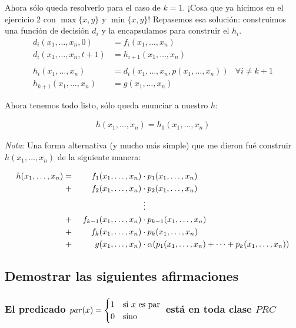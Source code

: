 \documentclass[fleqn, 11pt]{article}
\begin{document}
Ahora sólo queda resolverlo para el caso de $k = 1$. ¡Cosa que ya hicimos en el
ejercicio 2 con $\max\{x, y\}$ y $\min\{x, y\}$! Repasemos esa solución:
construimos una función de decisión $d_i$ y la encapsulamos para construir el
$h_i$.
\begin{align*}
	d_i(x_1, \dots, x_n, 0)     &= f_i(x_1, \dots, x_n) \\
	d_i(x_1, \dots, x_n, t + 1) &= h_{i + 1}(x_1, \dots, x_n) \\
	\\
	h_i(x_1, \dots, x_n)        &= d_i(x_1, \dots, x_n, p(x_1, \dots, x_n))
	& \forall i \neq k+1 \\
	h_{k+1}(x_1, \dots, x_n)    &= g(x_1, \dots, x_n)
\end{align*}

Ahora tenemos todo listo, sólo queda enunciar a nuestro $h$:

\begin{align*}
	h(x_1, \dots, x_n) = h_1(x_1, \dots, x_n)
\end{align*}

\emph{Nota}: Una forma alternativa (y mucho más simple) que me dieron fué
construir \\ $h(x_1, \dots, x_n)$ de la siguiente manera:

\begin{alignat*}{3}
	h(x_1, \dots, x_n)
	=&& f_1(x_1, \dots, x_n) &\cdot p_1(x_1, \dots, x_n) \\
	+&& f_2(x_1, \dots, x_n) &\cdot p_2(x_1, \dots, x_n) \\
	&&&\vdotswithin{\cdot} \\
	+&& \ f_{k-1}(x_1, \dots, x_n) &\cdot p_{k-1}(x_1, \dots, x_n) \\
	+&& f_k(x_1, \dots, x_n) &\cdot p_k(x_1, \dots, x_n) \\
	+&& g(x_1, \dots, x_n)
	&\cdot \alpha(p_1(x_1, \dots, x_n) + \cdots + p_k(x_1, \dots, x_n))
\end{alignat*}

\subsection{Demostrar las siguientes afirmaciones}

\subsubsection{El predicado $par (x) =
\protect\begin{cases}
	1 & \text{si $x$ es par} \\
	0 & \text{sino}
\protect\end{cases}$ está en toda clase $PRC$}
\end{document}
